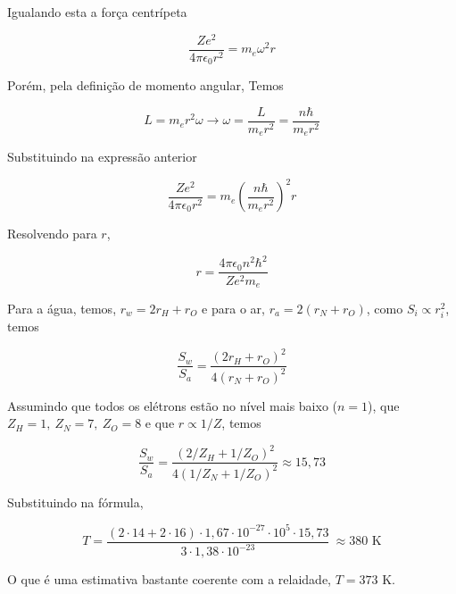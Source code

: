\documentclass[11pt]{article}
\begin{document}
\begin{pproblem}
\begin{pssolution*}{}{}
\begin{alternativas}
    Igualando esta a força centrípeta

    \[\frac{Ze^2}{4\pi \epsilon_0r^2} = m_e \omega^2 r\]

    Porém, pela definição de momento angular, Temos

    \[L = m_er^2\omega \rightarrow \omega = \frac{L}{m_er^2} = \frac{n\hbar}{m_er^2}\]

    Substituindo na expressão anterior 

    \[\frac{Ze^2}{4\pi\epsilon_0 r^2} = m_e \left(\frac{n\hbar}{m_er^2}\right)^2 r\]

    Resolvendo para \(r\), 

    \[r = \frac{4\pi\epsilon_0 n^2\hbar ^2}{Z e^2 m_e}\]

    \item Para a água, temos, \(r_w = 2r_H + r_O\) e para o ar, \(r_a = 2(r_N + r_O)\), como \(S_i \propto r_i^2\), temos 
    
    \[\frac{S_w}{S_a} = \frac{(2r_H + r_O)^2}{4(r_N + r_O)^2}\]

    Assumindo que todos os elétrons estão no nível mais baixo (\(n=1\)), que \(Z_H = 1, \ Z_N = 7, \ Z_O = 8\) e que \(r\propto 1/Z\), temos 
    
    \[\boxed{\frac{S_w}{S_a}=\frac{(2/Z_H + 1/Z_O)^2}{4(1/Z_N + 1/Z_O)^2} \approx 15,73}\]

    \item Substituindo na fórmula, 

    \[T = \frac{(2\cdot 14 + 2 \cdot 16) \cdot 1,67 \cdot 10^{-27} \cdot 10^{5} \cdot 15,73}{3 \cdot 1,38\cdot 10^{-23}} \ \boxed{\approx 380\text{ K}}\]

    O que é uma estimativa bastante coerente com a relaidade, \(T = 373\) K.
\end{alternativas}
    



    
    
\end{pssolution*}
\end{pproblem}
\end{document}
